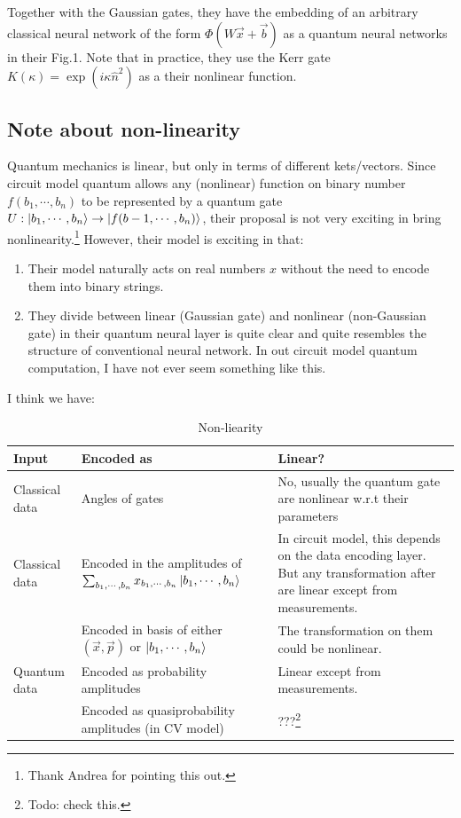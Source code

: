 \documentclass{article}
\begin{document}
Together with the Gaussian gates, they have the embedding of an arbitrary
classical neural network of the form $\Phi(W\vec{x}+\vec{b})$ as a quantum
neural networks in their Fig.1. Note that in practice, they use the Kerr gate
$K(\kappa) = \exp(i\kappa \hat{n}^2)$ as a their nonlinear function.

\subsection{Note about non-linearity}
\label{sec:Note about non-linearity}

Quantum mechanics is linear, but only in terms of different kets/vectors. Since
circuit model quantum allows any (nonlinear) function on binary number
$f(b_1,\cdots,b_n)$ to be represented by a quantum gate
$U:\ket{b_1,\cdots,b_n}\to \ket{f(b-1,\cdots,b_n)}$, their proposal is not very
exciting in bring nonlinearity.\footnote{Thank Andrea for pointing this out.}
However, their model is exciting in that:
\begin{enumerate}
  \item Their model naturally acts on real numbers $x$ without the need to
    encode them into binary strings.
  \item They divide between linear (Gaussian gate) and nonlinear (non-Gaussian
    gate) in their quantum neural layer is quite clear and quite resembles the
    structure of conventional neural network. In out circuit model quantum
    computation, I have not ever seem something like this.
\end{enumerate}

I think we have:

\begin{table}[H]
  \centering
  \caption{Non-liearity}
  \begin{tabu}{X[0.5] X X}
    Input & Encoded as & Linear? \\
    \hline
    Classical data & Angles of gates & No, usually the quantum gate are
    nonlinear w.r.t their parameters \\
    \hline
    Classical data & Encoded in the amplitudes of
    $\sum_{b_1,\cdots,b_n}x_{b_1,\cdots,b_n}\ket{b_1,\cdots,b_n}$ & 
    In circuit model, this depends on the data encoding layer. But any
    transformation after are linear except from measurements. 
    \\
    & Encoded in basis of either $(\vec{x},\vec{p})$ or $\ket{b_1,\cdots,b_n}$ & 
    The transformation on them could be nonlinear.
    \\
    \hline
    Quantum data & Encoded as probability amplitudes & Linear except from
    measurements. \\
    & Encoded as quasiprobability amplitudes (in CV model) & ???\footnote{Todo:
  check this.}
  \end{tabu}
\end{table}
\end{document}
